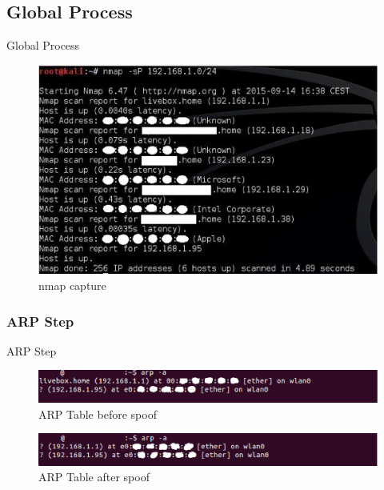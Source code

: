 \documentclass{beamer}
\begin{document}
\subsection{Global Process}
\begin{frame}{Global Process}
	\begin{figure}[!h]
		\centering
		\includegraphics[scale=0.45]{../images/captureNMAP.eps}
		\caption{nmap capture} %
		\label{nmap_capture} %
	\end{figure}
\end{frame}

\subsubsection{ARP Step}
\begin{frame}{ARP Step}
	\begin{figure}[!h]
		\centering
		\includegraphics[scale=0.50]{../images/arpTableBeforeSpoof.eps}
		\caption{ARP Table before spoof}
		\label{ARP_before_spoof}
	\end{figure}
	\begin{figure}[!h]
		\centering
		\includegraphics[scale=0.50]{../images/arpTableAfterSpoof.eps}
		\caption{ARP Table after spoof}
		\label{ARP_after_spoof}
	\end{figure}	
\end{frame}
\end{document}
